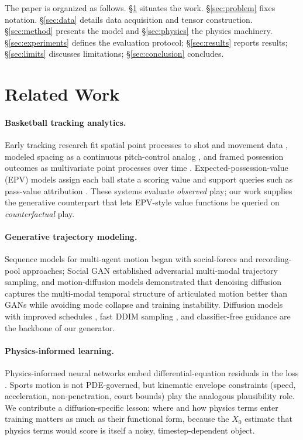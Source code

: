 \documentclass[11pt]{article}
\begin{document}
The paper is organized as follows. \S\ref{sec:related} situates the work.
\S\ref{sec:problem} fixes notation. \S\ref{sec:data} details data acquisition
and tensor construction. \S\ref{sec:method} presents the model and
\S\ref{sec:physics} the physics machinery. \S\ref{sec:experiments} defines the
evaluation protocol; \S\ref{sec:results} reports results; \S\ref{sec:limits}
discusses limitations; \S\ref{sec:conclusion} concludes.

\section{Related Work}
\label{sec:related}

\paragraph{Basketball tracking analytics.}
Early tracking research fit spatial point processes to shot and movement
data \citep{miller2014factorized}, modeled spacing as a continuous
pitch-control analog \citep{skinner2015pitch}, and framed possession outcomes
as multivariate point processes over time \citep{cervone2016multivariate}.
Expected-possession-value (EPV) models assign each ball state a scoring
value and support queries such as pass-value attribution
\citep{yamamoto2022epv}. These systems evaluate \emph{observed} play; our
work supplies the generative counterpart that lets EPV-style value functions
be queried on \emph{counterfactual} play.

\paragraph{Generative trajectory modeling.}
Sequence models for multi-agent motion began with social-forces and
recording-pool approaches; Social GAN \citep{gupta2018social} established
adversarial multi-modal trajectory sampling, and motion-diffusion models
\citep{tevet2023mld} demonstrated that denoising diffusion captures the
multi-modal temporal structure of articulated motion better than GANs while
avoiding mode collapse and training instability. Diffusion models
\citep{ho2020ddpm,song2021score} with improved schedules
\citep{nichol2021improved}, fast DDIM sampling \citep{song2021ddim}, and
classifier-free guidance \citep{ho2022cfg} are the backbone of our generator.

\paragraph{Physics-informed learning.}
Physics-informed neural networks embed differential-equation residuals in the
loss \citep{raissi2019physics}. Sports motion is not PDE-governed, but
kinematic envelope constraints (speed, acceleration, non-penetration, court
bounds) play the analogous plausibility role. We contribute a diffusion-specific
lesson: where and how physics terms enter training matters as much as their
functional form, because the $X_0$ estimate that physics terms would score is
itself a noisy, timestep-dependent object.
\end{document}
